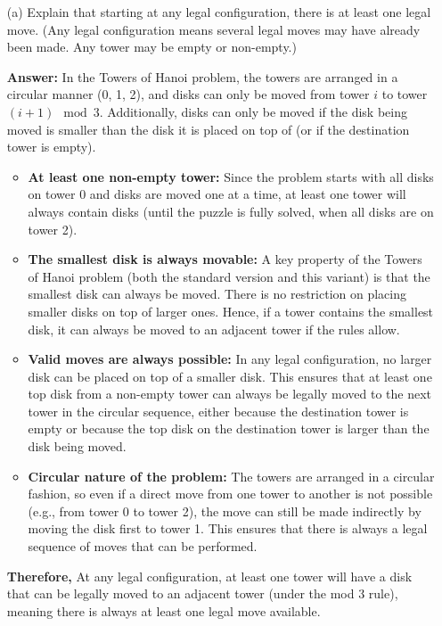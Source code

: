 \documentclass[12pt]{article}
\begin{document}
\begin{itemize}
 \item[(a)] Explain that starting at any legal configuration, there is at least one legal move. (Any legal configuration means several legal moves may have already been made. Any tower may be empty or non-empty.)

 {\bf Answer:} In the Towers of Hanoi problem, the towers are arranged in a circular manner (0, 1, 2), and disks can only be moved from tower $i$ to tower $(i+1) \mod 3$. Additionally, disks can only be moved if the disk being moved is smaller than the disk it is placed on top of (or if the destination tower is empty).
 \begin{itemize}
    \item \textbf{At least one non-empty tower:} Since the problem starts with all disks on tower 0 and disks are moved one at a time, at least one tower will always contain disks (until the puzzle is fully solved, when all disks are on tower 2).
    \item \textbf{The smallest disk is always movable:} A key property of the Towers of Hanoi problem (both the standard version and this variant) is that the smallest disk can always be moved. There is no restriction on placing smaller disks on top of larger ones. Hence, if a tower contains the smallest disk, it can always be moved to an adjacent tower if the rules allow.
    \item \textbf{Valid moves are always possible:} In any legal configuration, no larger disk can be placed on top of a smaller disk. This ensures that at least one top disk from a non-empty tower can always be legally moved to the next tower in the circular sequence, either because the destination tower is empty or because the top disk on the destination tower is larger than the disk being moved.
    \item \textbf{Circular nature of the problem:} The towers are arranged in a circular fashion, so even if a direct move from one tower to another is not possible (e.g., from tower 0 to tower 2), the move can still be made indirectly by moving the disk first to tower 1. This ensures that there is always a legal sequence of moves that can be performed.
  \end{itemize}

  \textbf{Therefore,} At any legal configuration, at least one tower will have a disk that can be legally moved to an adjacent tower (under the mod 3 rule), meaning there is always at least one legal move available.


\end{itemize}
\end{document}
